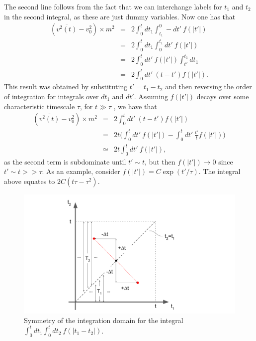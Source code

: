 The second line follows from the fact that we can interchange labels for $t_1$ and $t_2$ in the second integral, as these are just dummy variables. Now one has that
\begin{eqnarray}
(\overline{v^2(t)}-v_0^2) \times m^2 &=& 2 \int_{0}^{t} dt_1 \int_{t_1}^{0} -dt' ~f(|t'|)  \nonumber \\ 
&=& 2 \int_{0}^{t} dt_1 \int_{0}^{t_1} dt' ~f(|t'|)  \nonumber \\ 
&=& 2 \int_{0}^{t} dt'~f(|t'|) \int_{t'}^{t_1} dt_1  \nonumber \\ 
&=& 2 \int_{0}^{t} dt'~ (t-t')f(|t'|).
\end{eqnarray}
This result was obtained by substituting $t'=t_1-t_2$ and then reversing the order of integration for integrals over $dt_1$ and $dt'$. Assuming $f(|t'|)$ decays over some characteristic timescale $\tau$, for $t\gg \tau$ , we have that 
\begin{eqnarray}
(\overline{v^2(t)}-v_0^2) \times m^2 &=& 2 \int_{0}^{t} dt'~ (t-t')f(|t'|) \\
&=& 2 t \bigg( \int_{0}^{t} dt'~ f(|t'|) - \int_{0}^{t} dt'~ \frac{t'}{t} f(|t'|)\bigg)\\
& \simeq & 2t \int_{0}^{t} dt'~ f(|t'|),
\end{eqnarray}
as the second term is subdominate until $t'\sim t$, but then $f(|t'|) \rightarrow 0$ since $t'\sim t>>\tau$. As an example, consider $f(|t'|)=C \exp(t'/\tau)$. The integral above equates to $2C(t \tau - \tau^2)$.
\begin{figure}[h]
\includegraphics[width=16cm]{fig_problem_3p3.png}
    \caption{Symmetry of the integration domain for the integral $ \int_{0}^{t} dt_1 \int_{0}^{t} dt_2 ~ f(|t_1-t_2|)$.}
    \label{fig:3p3}
\end{figure}